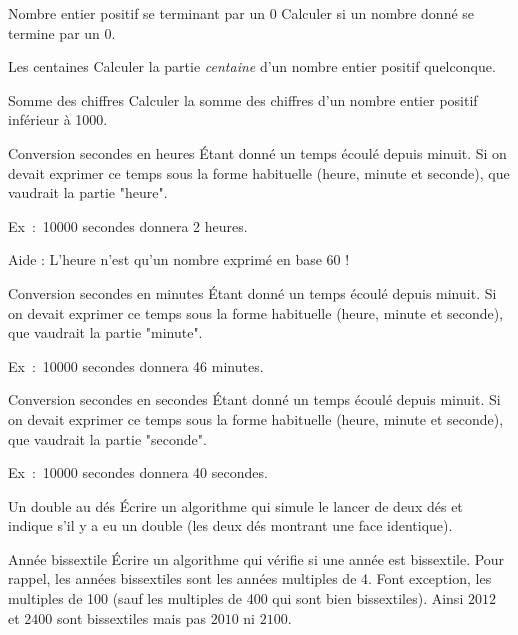 			\begin{Exercice}{Nombre entier positif se terminant par un 0}
				Calculer si un nombre donné se termine par un 0.
			\end{Exercice}
	
			\begin{Exercice}{Les centaines}
				Calculer la partie \emph{centaine}
				d'un nombre entier positif quelconque.
			\end{Exercice}
	
			\begin{Exercice}{Somme des chiffres}
				Calculer la somme des chiffres
				d’un nombre entier positif inférieur à 1000.
			\end{Exercice}
		
			\begin{Exercice}{Conversion secondes en heures}
				Étant donné un temps écoulé depuis minuit.
				Si on devait exprimer ce temps sous la forme
				habituelle (heure, minute et seconde),
				que vaudrait la partie "heure".
		
				Ex~:~10000 secondes donnera 2 heures.
				
				Aide : L'heure n'est qu'un nombre exprimé en base 60 !
			\end{Exercice}
		
			\begin{Exercice}{Conversion secondes en minutes}
				Étant donné un temps écoulé depuis minuit.
				Si on devait exprimer ce temps sous la forme
				habituelle (heure, minute et seconde),
				que vaudrait la partie "minute".
		
				Ex~:~10000 secondes donnera 46 minutes.
			\end{Exercice}
		
			\begin{Exercice}{Conversion secondes en secondes}
				Étant donné un temps écoulé depuis minuit.
				Si on devait exprimer ce temps sous la forme
				habituelle (heure, minute et seconde),
				que vaudrait la partie "seconde".
		
				Ex~:~10000 secondes donnera 40 secondes.
			\end{Exercice}	

			\begin{Exercice}{Un double au dés}
				Écrire un algorithme qui simule le lancer de deux dés
				et indique s'il y a eu un double 
				(les deux dés montrant une face identique).
			\end{Exercice}
		
			\begin{Exercice}{Année bissextile}
				\label{ex:bissextile}
				Écrire un algorithme qui vérifie si une année est bissextile. 
				Pour rappel, les années bissextiles sont les années multiples de 4. 
				Font exception, les multiples de 100 
				(sauf les multiples de 400 qui sont bien bissextiles). 
				Ainsi $2012$ et $2400$ sont bissextiles mais pas $2010$ ni $2100$.
			\end{Exercice}
			 		 
